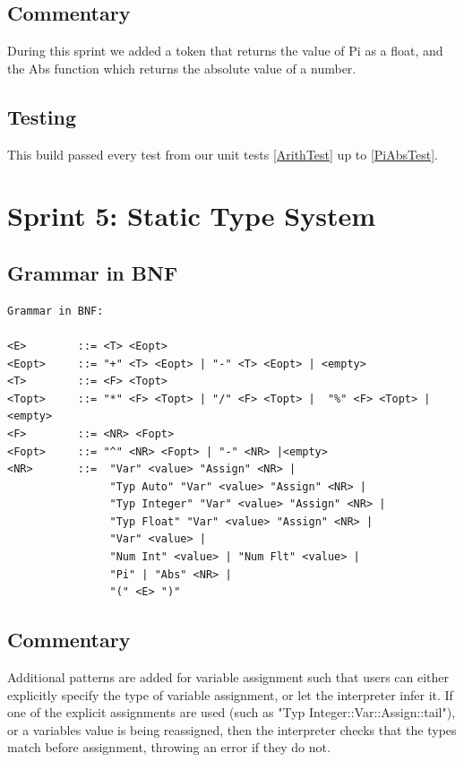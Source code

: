 \documentclass[a4paper, oneside, 11pt]{report}
\begin{document}
    \subsection{Commentary}
    During this sprint we added a token that returns the value of Pi as a float, and the Abs function which returns the absolute value of a number.


    \subsection{Testing}

    This build passed every test from our unit tests \ref{ArithTest} up to \ref{PiAbsTest}.

    \clearpage
    \section{Sprint 5: Static Type System}
    \subsection{Grammar in BNF}
    \begin{verbatim}
Grammar in BNF:

<E>        ::= <T> <Eopt>
<Eopt>     ::= "+" <T> <Eopt> | "-" <T> <Eopt> | <empty>
<T>        ::= <F> <Topt>
<Topt>     ::= "*" <F> <Topt> | "/" <F> <Topt> |  "%" <F> <Topt> |<empty>
<F>        ::= <NR> <Fopt>
<Fopt>     ::= "^" <NR> <Fopt> | "-" <NR> |<empty>
<NR>       ::=  "Var" <value> "Assign" <NR> |
                "Typ Auto" "Var" <value> "Assign" <NR> |
                "Typ Integer" "Var" <value> "Assign" <NR> |
                "Typ Float" "Var" <value> "Assign" <NR> |
                "Var" <value> |
                "Num Int" <value> | "Num Flt" <value> |
                "Pi" | "Abs" <NR> |
                "(" <E> ")"
    \end{verbatim}
    \subsection{Commentary}
    Additional patterns are added for variable assignment such that users can either explicitly specify the type of variable assignment, or let the interpreter infer it.
    If one of the explicit assignments are used (such as "Typ Integer::Var::Assign::tail"), or a variables value is being reassigned, then the interpreter checks that the types match before assignment, throwing an error if they do not.
\end{document}
